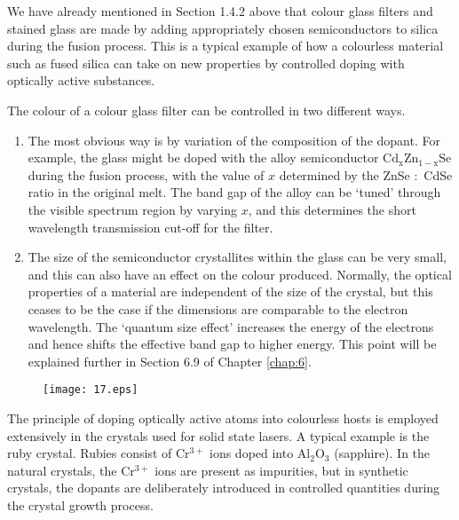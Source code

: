 \documentclass[12pt]{book}
\begin{document}
We have already mentioned in Section 1.4.2 above that colour glass filters and stained glass are made by adding appropriately chosen semiconductors to silica during the fusion process. This is a typical example of how a colourless material such as fused silica can take on new properties by controlled doping with optically active substances.

The colour of a colour glass filter can be controlled in two different ways.
\begin{enumerate}
  \item The most obvious way is by variation of the composition of the dopant. For example, the glass might be doped with the alloy semiconductor $\mathrm{Cd_xZn_{1-x}Se}$ during the fusion process, with the value of $x$ determined by the ZnSe $:$ CdSe ratio in the original melt. The band gap of the alloy can be `tuned' through the visible spectrum region by varying $x$, and this determines the short wavelength transmission cut-off for the filter.
  \item The size of the semiconductor crystallites within the glass can be very small, and this can also have an effect on the colour produced. Normally, the optical properties of a material are independent of the size of the crystal, but this ceases to be the case if the dimensions are comparable to the electron wavelength. The `quantum size effect' increases the energy of the electrons and hence shifts the effective band gap to higher energy. This point will be explained further in Section 6.9 of Chapter \ref{chap:6}.
\end{enumerate}

\begin{figure}
  \centering
  \texttt{[image: 17.eps]}\\
  \label{fig:1.7}
\end{figure}


The principle of doping optically active atoms into colourless hosts is employed extensively in the crystals used for solid state lasers. A typical example is the ruby crystal. Rubies consist of $\mathrm{Cr^{3+}}$ ions doped into $\mathrm{Al_2O_3}$ (sapphire). In the natural crystals, the $\mathrm{Cr^{3+}}$ ions are present as impurities, but in synthetic crystals, the dopants are deliberately introduced in controlled quantities during the crystal growth process.
\end{document}
